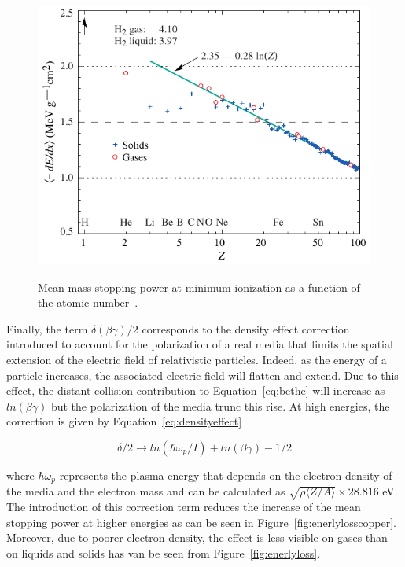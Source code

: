 	\begin{figure}[H]
		\centering
		\includegraphics[width = 0.8\plotwidth]{fig/chapt4/dedx_min_06.pdf}\\
		\caption{\label{fig:miplossrate} Mean mass stopping power at minimum ionization as a function of the atomic number~\cite{PDG2018}.}
	\end{figure}
	
	Finally, the term $\delta(\beta\gamma)/2$ corresponds to the density effect correction introduced to account for the polarization of a real media that limits the spatial extension of the electric field of relativistic particles. Indeed, as the energy of a particle increases, the associated electric field will flatten and extend. Due to this effect, the distant collision contribution to Equation~\ref{eq:bethe} will increase as $ln(\beta\gamma)$ but the polarization of the media trunc this rise. At high energies, the correction is given by Equation~\ref{eq:densityeffect}
	
	\begin{equation}
	\label{eq:densityeffect}
	\delta/2 \longrightarrow ln(\hbar\omega_p/I) + ln(\beta\gamma) - 1/2
	\end{equation}
	
	where $\hbar\omega_p$ represents the plasma energy that depends on the electron density of the media and the electron mass and can be calculated as $\sqrt{\rho\langle Z/A \rangle} \times 28.816$ \si{eV}. The introduction of this correction term reduces the increase of the mean stopping power at higher energies as can be seen in Figure~\ref{fig:enerlylosscopper}. Moreover, due to poorer electron density, the effect is less visible on gases than on liquids and solids has van be seen from Figure~\ref{fig:enerlyloss}.
	
